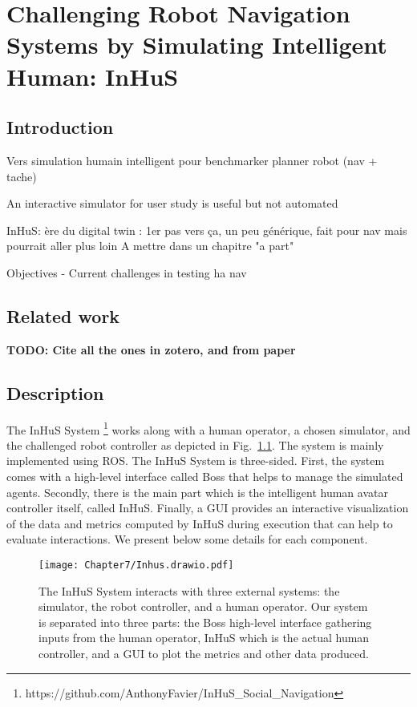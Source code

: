 \ifdefined{}
\else
\setcounter{chapter}{6} %
\dominitoc
\faketableofcontents
\fi

\chapter{Challenging Robot Navigation Systems by Simulating Intelligent Human: InHuS}
\label{chap:7}
\minitoc

\section{Introduction}
Vers simulation humain intelligent pour benchmarker planner robot (nav + tache)

An interactive simulator for user study is useful but not automated

InHuS:
ère du digital twin : 1er pas vers ça, un peu générique, fait pour nav mais pourrait aller plus loin
A mettre dans un chapitre "a part"

Objectives - Current challenges in testing ha nav

\section{Related work}

\textbf{TODO: Cite all the ones in zotero, and from paper}

\section{Description}
 
The InHuS System%
\footnote{https://github.com/AnthonyFavier/InHuS\_Social\_Navigation}
works along with a human operator, a chosen simulator, and the challenged robot controller as depicted in Fig.~\ref{fig:overview}. The system is mainly implemented using ROS. The InHuS  System is three-sided. First, the system comes with a high-level interface called Boss that helps to manage the simulated agents. Secondly, there is the main part which is the intelligent human avatar controller itself, called InHuS.
Finally, a GUI provides an interactive visualization of the data and metrics computed by InHuS during execution that can help to evaluate interactions. We present below some details for each component.

\begin{figure}[ht]
    \centering
    \texttt{[image: Chapter7/Inhus.drawio.pdf]}
    \caption{
    The InHuS System interacts with three external systems: the simulator, the robot controller, and a human operator. Our system is separated into three parts: the Boss high-level interface gathering inputs from the human operator, InHuS which is the actual human controller, and a GUI to plot the metrics and other data produced.
    }
    \label{fig:overview}
    \vspace{-0.8cm}
\end{figure}

